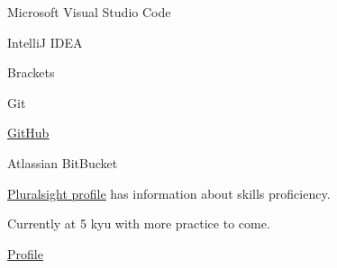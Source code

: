 \documentclass[]{deedy-resume-openfont}
\begin{document}
\descript{}
\begin{tightemize}
\item Microsoft Visual Studio Code
\item IntelliJ IDEA
\item Brackets
\end{tightemize}
\sectionsep

\descript{}
\begin{tightemize}
\item Git
\item \href{https://github.com/sirkoik}{\underline{GitHub}}
\item Atlassian BitBucket
\end{tightemize}
\sectionsep

\descript{}
\begin{tightemize}
\item \href{https://app.pluralsight.com/profile/alexander-koik-cesto}{\underline{Pluralsight profile}} has information about skills proficiency.
\end{tightemize}
\sectionsep

\descript{}
\begin{tightemize}
\item Currently at 5 kyu with more practice to come.
\item \href{https://www.codewars.com/users/sirkoik}{\underline{Profile}}
\end{tightemize}


\end{document}
